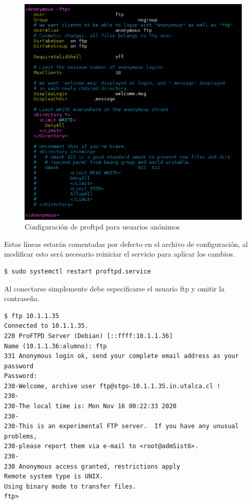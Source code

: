 \documentclass[12pt]{article}
\begin{document}
\begin{figure}[!h]
   \centering
   \includegraphics[scale=.39]{imgs/ftp_conf.PNG}
   \caption{Configuración de proftpd para usuarios anónimos}
   \label{fig8}
\end{figure}
Estas líneas estarán comentadas por defecto en el archivo de configuración, al modificar esto será necesario reiniciar el servicio para aplicar los cambios.

\begin{lstlisting}[frame=single]
$ sudo systemctl restart proftpd.service
\end{lstlisting}

Al conectarse simplemente debe especificarse el usuario ftp y omitir la contraseña.
\begin{lstlisting}[frame=single]
$ ftp 10.1.1.35
Connected to 10.1.1.35.
220 ProFTPD Server (Debian) [::ffff:10.1.1.36]
Name (10.1.1.36:alumno): ftp
331 Anonymous login ok, send your complete email address as your password
Password:
230-Welcome, archive user ftp@stgo-10.1.1.35.in.utalca.cl !
230-
230-The local time is: Mon Nov 16 00:22:33 2020
230-
230-This is an experimental FTP server.  If you have any unusual problems,
230-please report them via e-mail to <root@admSist6>.
230-
230 Anonymous access granted, restrictions apply
Remote system type is UNIX.
Using binary mode to transfer files.
ftp> 
\end{lstlisting}
\end{document}
